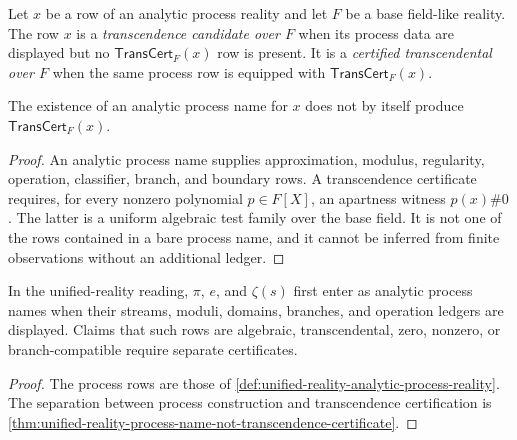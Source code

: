 \begin{definition}
\label{def:unified-reality-process-candidate-certified-transcendental}
Let $x$ be a row of an analytic process reality and let $F$ be a base
field-like reality. The row $x$ is a \emph{transcendence candidate over
$F$} when its process data are displayed but no
$\mathsf{TransCert}_F(x)$ row is present. It is a
\emph{certified transcendental over $F$} when the same process row is
equipped with $\mathsf{TransCert}_F(x)$.
\end{definition}

\begin{theorem}
\label{thm:unified-reality-process-name-not-transcendence-certificate}
The existence of an analytic process name for $x$ does not by itself
produce $\mathsf{TransCert}_F(x)$.
\end{theorem}

\begin{proof}
An analytic process name supplies approximation, modulus, regularity,
operation, classifier, branch, and boundary rows. A transcendence
certificate requires, for every nonzero polynomial $p\in F[X]$, an
apartness witness $p(x)\#0$. The latter is a uniform algebraic test
family over the base field. It is not one of the rows contained in a
bare process name, and it cannot be inferred from finite observations
without an additional ledger.
\end{proof}

\begin{corollary}
\label{cor:unified-reality-analytic-constants-process-before-algebraic-claims}
In the unified-reality reading, $\pi$, $e$, and $\zeta(s)$ first enter as
analytic process names when their streams, moduli, domains, branches,
and operation ledgers are displayed. Claims that such rows are algebraic,
transcendental, zero, nonzero, or branch-compatible require separate
certificates.
\end{corollary}

\begin{proof}
The process rows are those of
\autoref{def:unified-reality-analytic-process-reality}. The separation
between process construction and transcendence certification is
\autoref{thm:unified-reality-process-name-not-transcendence-certificate}.
\end{proof}

